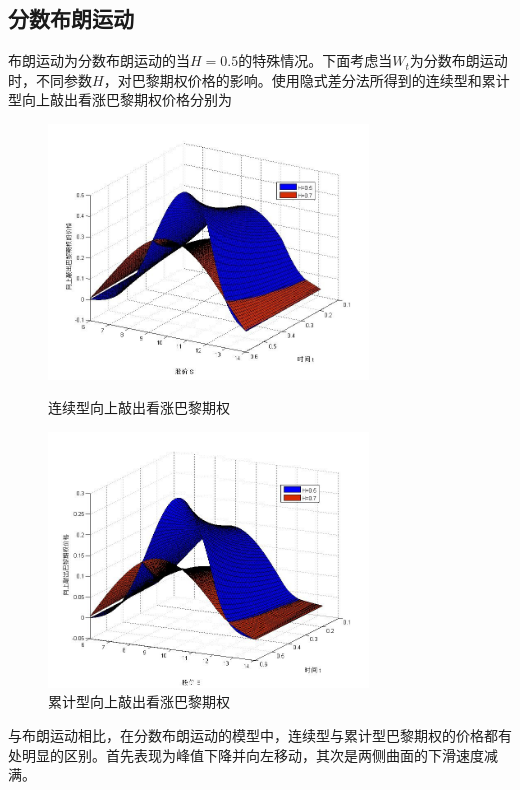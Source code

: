 \documentclass{ctexart} %
\begin{document}
\subsection{分数布朗运动}
布朗运动为分数布朗运动的当$H=0.5$的特殊情况。下面考虑当$W_t$为分数布朗运动时，不同参数$H$，对巴黎期权价格的影响。使用隐式差分法所得到的连续型和累计型向上敲出看涨巴黎期权价格分别为
\begin{figure}[H]
\begin{minipage}{0.48\linewidth}
\includegraphics[width=8.5cm]{code/paris_fbm1.jpg}
\caption{连续型向上敲出看涨巴黎期权}
\end{minipage}
\begin{minipage}{0.48\linewidth}
\includegraphics[width=8.5cm]{code/parisc_fbm1.jpg}
\caption{累计型向上敲出看涨巴黎期权}
\end{minipage}
\end{figure}
与布朗运动相比，在分数布朗运动的模型中，连续型与累计型巴黎期权的价格都有处明显的区别。首先表现为峰值下降并向左移动，其次是两侧曲面的下滑速度减满。
\end{document}
